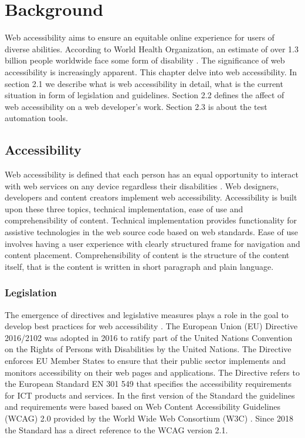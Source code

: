 \chapter{Background\label{background}}

Web accessibility aims to ensure an equitable online experience for users of diverse abilities. According to World Health Organization, an estimate of over 1.3 billion people worldwide face some form of disability \citep{whodisability}. The significance of web accessibility is increasingly apparent. This chapter delve into web accessibility. In section 2.1 we describe what is web accessibility in detail, what is the current situation in form of legislation and guidelines. Section 2.2 defines the affect of web accessibility on a web developer's work. Section 2.3 is about the test automation tools.

\section{Accessibility}

Web accessibility is defined that each person has an equal opportunity to interact with web services on any device regardless their disabilities \citep{webaccessibilitydefinition}. Web designers, developers and content creators implement web accessibility. Accessibility is built upon these three topics, technical implementation, ease of use and comprehensibility of content. Technical implementation provides functionality for assistive technologies in the web source code based on web standards. Ease of use involves having a user experience with clearly structured frame for navigation and content placement. Comprehensibility of content is the structure of the content itself, that is the content is written in short paragraph and plain language. 



\subsection{Legislation}

The emergence of directives and legislative measures plays a role in the goal to develop best practices for web accessibility \citep{eudirective2016}. The European Union (EU) Directive 2016/2102 was adopted in 2016 to ratify part of the United Nations Convention on the Rights of Persons with Disabilities by the United Nations. The Directive enforces EU Member States to ensure that their public sector implements and monitors accessibility on their web pages and applications. The Directive refers to the European Standard EN 301 549 that specifies the accessibility requirements for ICT products and services. In the first version of the Standard the guidelines and requirements were based based on Web Content Accessibility Guidelines (WCAG) 2.0 provided by the World Wide Web Consortium (W3C) \citep{wcagadoptioneurope}. Since 2018 the Standard has a direct reference to the WCAG version 2.1.

